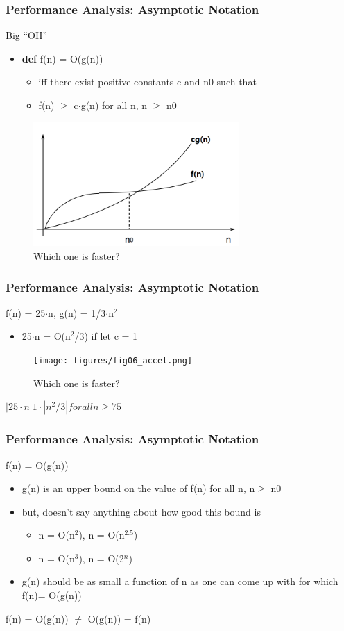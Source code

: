 \documentclass[newPxFont,sthlmFooter,nooffset]{beamer}
\begin{document}
\begin{frame}[t]
  \frametitle{Performance Analysis: Asymptotic Notation}
Big ``OH''
\begin{itemize}
\item \textbf{def} f(n) = O(g(n))
  \begin{itemize}
  \item iff there exist positive constants c and n0 such that
  \item f(n) $\geq$ c$\cdot$g(n) for all n, n $\geq$ n0
  \end{itemize}
\end{itemize}
  \begin{figure}[h]
    \centering
    \includegraphics[width=0.7\textwidth]{figures/fig05_bigoh.png}
    \caption{Which one is faster?}
  \end{figure}
\end{frame}

\begin{frame}[t]
  \frametitle{Performance Analysis: Asymptotic Notation}
 f(n) = 25$\cdot$n, g(n) = 1/3$\cdot$n$^2$ 
\begin{itemize}
\item 25$\cdot$n = O(n$^2$/3) if let c = 1
\end{itemize}

  \begin{figure}[h]
    \centering
    \texttt{[image: figures/fig06\_accel.png]}
    \caption{Which one is faster?}
  \end{figure}
$ |25\cdot n|   1\cdot|n^2/3| for all n \geq  75$
\end{frame}

\begin{frame}[t]
  \frametitle{Performance Analysis: Asymptotic Notation}
f(n) = O(g(n))
\begin{itemize}
\item g(n) is an upper bound on the value of f(n) for all n, n$\geq$ n0
\item  but, doesn’t say anything about how good this bound is
  \begin{itemize}
  \item n = O(n$^2$), n = O(n$^{2.5}$)
  \item n = O(n$^3$), n = O(2$^n$)
  \end{itemize}

\item g(n) should be as small a function
  of n as one can come up with for which f(n)= O(g(n))
\end{itemize}

f(n) = O(g(n)) $\neq$  O(g(n)) = f(n)
\end{frame}
\end{document}
